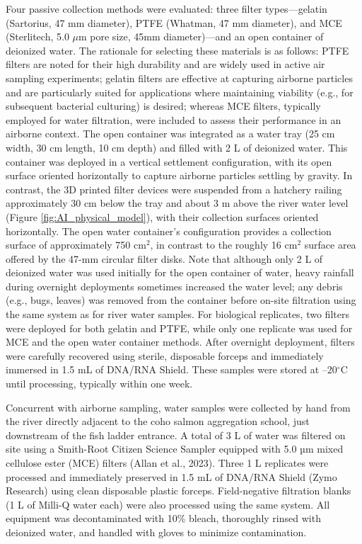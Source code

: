 \documentclass{article}
\begin{document}
Four passive collection methods were evaluated: three filter types—gelatin (Sartorius, 47 mm diameter), PTFE (Whatman, 47 mm diameter), and MCE (Sterlitech, 5.0 $\mu$m pore size, 45mm diameter)—and an open container of deionized water. The rationale for selecting these materials is as follows: PTFE filters are noted for their high durability and are widely used in active air sampling experiments; gelatin filters are effective at capturing airborne particles and are particularly suited for applications where maintaining viability (e.g., for subsequent bacterial culturing) is desired; whereas MCE filters, typically employed for water filtration, were included to assess their performance in an airborne context. The open container was integrated as a water tray (25 cm width, 30 cm length, 10 cm depth) and filled with 2 L of deionized water. This container was deployed in a vertical settlement configuration, with its open surface oriented horizontally to capture airborne particles settling by gravity. In contrast, the 3D printed filter devices were suspended from a hatchery railing approximately 30 cm below the tray and about 3 m above the river water level (Figure \ref{fig:AI_physical_model}), with their collection surfaces oriented horizontally. The open water container’s configuration provides a collection surface of approximately 750 cm$^2$, in contrast to the roughly 16 cm$^2$ surface area offered by the 47-mm circular filter disks. Note that although only 2 L of deionized water was used initially for the open container of water, heavy rainfall during overnight deployments sometimes increased the water level; any debris (e.g., bugs, leaves) was removed from the container before on-site filtration using the same system as for river water samples. For biological replicates, two filters were deployed for both gelatin and PTFE, while only one replicate was used for MCE and the open water container methods. After overnight deployment, filters were carefully recovered using sterile, disposable forceps and immediately immersed in 1.5 mL of DNA/RNA Shield. These samples were stored at –20$^\circ$C until processing, typically within one week.

Concurrent with airborne sampling, water samples were collected by hand from the river directly adjacent to the coho salmon aggregation school, just downstream of the fish ladder entrance. A total of 3 L of water was filtered on site using a Smith-Root Citizen Science Sampler equipped with 5.0 µm mixed cellulose ester (MCE) filters (Allan et al., 2023). Three 1 L replicates were processed and immediately preserved in 1.5 mL of DNA/RNA Shield (Zymo Research) using clean disposable plastic forceps. Field-negative filtration blanks (1 L of Milli-Q water each) were also processed using the same system. All equipment was decontaminated with 10\% bleach, thoroughly rinsed with deionized water, and handled with gloves to minimize contamination.
\end{document}
